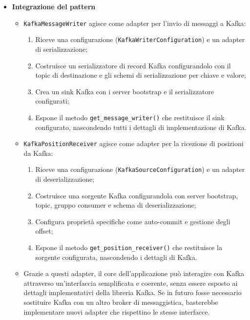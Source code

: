 \documentclass[10pt]{article}
\begin{document}
\begin{itemize}
    \item \textbf{Integrazione del pattern}
    \begin{itemize}
        \item \texttt{KafkaMessageWriter} agisce come adapter per l'invio di messaggi a Kafka:
        \begin{enumerate}
            \item Riceve una configurazione (\texttt{KafkaWriterConfiguration}) e un adapter di serializzazione;
            \item Costruisce un serializzatore di record Kafka configurandolo con il topic di destinazione e gli schemi di serializzazione per chiave e valore;
            \item Crea un sink Kafka con i server bootstrap e il serializzatore configurati;
            \item Espone il metodo \texttt{get\_message\_writer()} che restituisce il sink configurato, nascondendo tutti i dettagli di implementazione di Kafka.
        \end{enumerate}
        
        \item \texttt{KafkaPositionReceiver} agisce come adapter per la ricezione di posizioni da Kafka:
        \begin{enumerate}
            \item Riceve una configurazione (\texttt{KafkaSourceConfiguration}) e un adapter di deserializzazione;
            \item Costruisce una sorgente Kafka configurandola con server bootstrap, topic, gruppo consumer e schema di deserializzazione;
            \item Configura proprietà specifiche come auto-commit e gestione degli offset;
            \item Espone il metodo \texttt{get\_position\_receiver()} che restituisce la sorgente configurata, nascondendo i dettagli di Kafka.
        \end{enumerate}
        
        \item Grazie a questi adapter, il core dell'applicazione può interagire con Kafka attraverso un'interfaccia semplificata e coerente, senza essere esposto ai dettagli implementativi della libreria Kafka. Se in futuro fosse necessario sostituire Kafka con un altro broker di messaggistica, basterebbe implementare nuovi adapter che rispettino le stesse interfacce.
    \end{itemize}
    \end{itemize}
\end{document}
